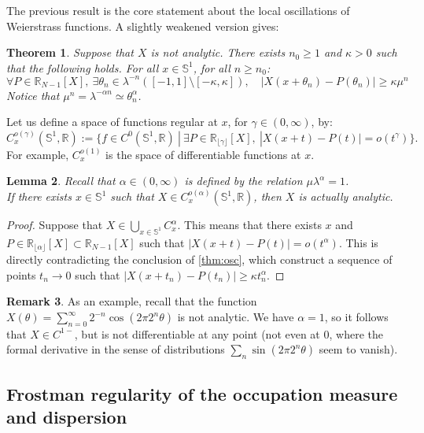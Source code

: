 \documentclass[11pt]{amsart}
\theoremstyle{plain}
\newtheorem{theorem}{Theorem}[section]
\newtheorem{lemma}[theorem]{Lemma}
\theoremstyle{definition}
\newtheorem{remark}[theorem]{Remark}
\numberwithin{equation}{section}
\begin{document}
The previous result is the core statement about the local oscillations of Weierstrass functions. A slightly weakened version gives:

\begin{theorem}{\label{thm:osc}}
Suppose that $X$ is not analytic. There exists $n_0 \geq 1$ and $\kappa>0$ such that the following holds. For all $x \in \mathbb{S}^1$, for all $n \geq n_0$:
$$ \forall P \in \mathbb{R}_{N-1}[X], \ \exists \theta_n \in \lambda^{-n}([-1,1] \setminus [-\kappa,\kappa]), \quad |X(x+\theta_n)-P(\theta_n)| \geq \kappa \mu^n$$
Notice that $\mu^n = \lambda^{-\alpha n} \simeq \theta_n^{\alpha}$.
\end{theorem}

Let us define a space of functions regular at $x$, for $\gamma \in (0,\infty)$, by:
$$ C^{o(\gamma)}_x(\mathbb{S}^1,\mathbb{R}) := \{ f \in C^0(\mathbb{S}^1,\mathbb{R}) \ | \ \exists P \in \mathbb{R}_{\lfloor \gamma \rfloor}[X], \ |X(x+t)-P(t)| = o(t^\gamma) \}. $$
For example, $C^{o(1)}_x$ is the space of differentiable functions at $x$.

\begin{lemma}
Recall that $\alpha \in (0,\infty)$ is defined by the relation $\mu \lambda^\alpha=1$. \\ 
If there exists $x \in \mathbb{S}^1$ such that $X \in  C^{o(\alpha)}_x(\mathbb{S}^1,\mathbb{R})$, then $X$ is actually analytic. 
\end{lemma}

\begin{proof}
Suppose that $X \in \bigcup_{x \in \mathbb{S}^1} C^\alpha_x$. This means that there exists $x$ and $P \in \mathbb{R}_{\lfloor \alpha \rfloor}[X] \subset \mathbb{R}_{N-1}[X]$ such that $|X(x+t)-P(t)| = o(t^\alpha)$. This is directly contradicting the conclusion of \ref{thm:osc}, which construct a sequence of points $t_n \rightarrow 0$ such that $|
X(x+t_n)-P(t_n)| \geq \kappa t_n^\alpha$.
\end{proof}

\begin{remark}
As an example, recall that the function $X(\theta) = \sum_{n=0}^\infty 2^{-n}{\cos(2\pi 2^n \theta)}$ is not analytic. We have $\alpha=1$, so it follows that $X \in C^{1-}$, but is not differentiable at any point (not even at $0$, where the formal derivative in the sense of distributions $\sum_n \sin(2 \pi 2^n \theta)$ seem to vanish).
\end{remark}



\subsection{Frostman regularity of the occupation measure and dispersion}
\end{document}
